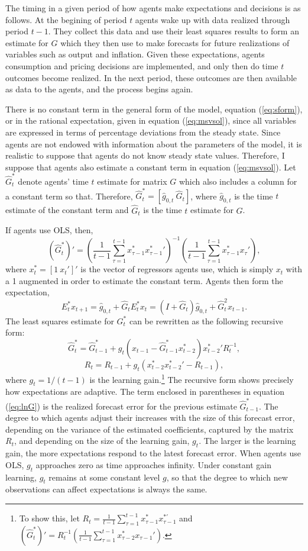\documentclass[12pt]{article}
\newcommand{\beq}{\begin{equation}}
\newcommand{\eeq}{\end{equation}}
\newcommand{\h}[1]{\hat{#1}}
\begin{document}
The timing in a given period of how agents make expectations and decisions is as follows.  At the begining of period $t$ agents wake up with data realized through period $t-1$.  They collect this data and use their least squares results to form an estimate for $G$ which they then use to make forecasts for future realizations of variables such as output and inflation.  Given these expectations, agents consumption and pricing decisions are implemented, and only then do time $t$ outcomes become realized.  In the next period, these outcomes are then available as data to the agents, and the process begins again.  

There is no constant term in the general form of the model, equation (\ref{eq:sform}), or in the rational expectation, given in equation (\ref{eq:msvsol}), since all variables are expressed in terms of percentage deviations from the steady state.  Since agents are not endowed with information about the parameters of the model, it is realistic to suppose that agents do not know steady state values.  Therefore, I suppose that agents also estimate a constant term in equation (\ref{eq:msvsol}).  Let $\h{G}_t^*$ denote agents' time $t$ estimate for matrix $G$ which also includes a column for a constant term so that.  Therefore, $\h{G}_t^* = [\h{g}_{0,t}~ \h{G}_t]$, where $\h{g}_{0,t}$ is the time $t$ estimate of the constant term and $\h{G}_t$ is the time $t$ estimate for $G$. 

If agents use OLS, then,
\beq \label{eq:Gsum} \left(\hat{G}_t^*\right)' = \left( \frac{1}{t-1} \sum_{\tau=1}^{t-1} x_{\tau-1}^* {x_{\tau-1}^{*}}' \right)^{-1} \left( \frac{1}{t-1} \sum_{\tau=1}^{t-1} x_{\tau-1}^* x_{\tau}' \right), \eeq 
where $x_t^* = [1~ x_t']'$ is the vector of regressors agents use, which is simply $x_t$ with a 1 augmented in order to estimate the constant term.   Agents then form the expectation,
\beq \label{eq:agfore} E_t^* x_{t+1} = \h{g}_{0,t} + \h{G}_t E_t^* x_t = (I + \h{G}_t)\h{g}_{0,t} + \h{G}_t^2 x_{t-1}. \eeq
The least squares estimate for $G_t^*$ can be rewritten as the following recursive form:
\beq \label{eq:lnG} \hat{G}_t^* = \hat{G}_{t-1}^* + g_t (x_{t-1} - \hat{G}_{t-1}^* x_{t-2}^*) {x_{t-2}^*}' R_t^{-1} ,\eeq
\beq \label{eq:lnR} R_t = R_{t-1} + g_t (x_{t-2}^* {x_{t-2}^*}' - R_{t-1}), \eeq
where $g_t=1/(t-1)$ is the learning gain.\footnote{To show this, let $R_t = \frac{1}{t-1} \sum_{\tau=1}^{t-1} x_{\tau-1}^* x_{\tau-1}^{*'}$ and $\left(\hat{G}_t^*\right)' = R_t^{-1} \left( \frac{1}{t-1} \sum_{\tau=1}^{t-1} x_{\tau-2}^* x_{\tau-1}' \right)$.}
The recursive form shows precisely how expectations are adaptive.  The term enclosed in parentheses in equation (\ref{eq:lnG}) is the realized forecast error for the previous estimate $\hat{G}_{t-1}^*$.  The degree to which agents adjust their increases with the size of this forecast error, depending on the variance of the estimated coefficients, captured by the matrix $R_t$, and depending on the size of the learning gain, $g_t$.  The larger is the learning gain, the more expectations respond to the latest forecast error.  When agents use OLS, $g_t$ approaches zero as time approaches infinity.  Under constant gain learning, $g_t$ remains at some constant level $g$, so that the degree to which new observations can affect expectations is always the same.  
\end{document}
